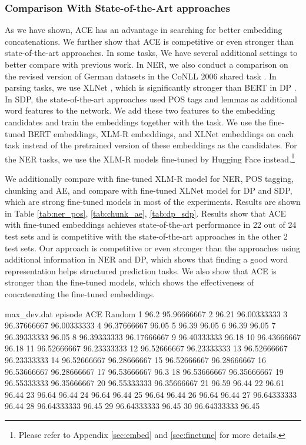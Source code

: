 \documentclass{article} \usepackage{iclr2021_conference,times}
\begin{document}
\subsubsection{Comparison With State-of-the-Art approaches} \label{sec:exp:finetune}
As we have shown, ACE has an advantage in searching for better embedding concatenations. We further show that ACE is competitive or even stronger than state-of-the-art approaches. In some tasks, We have several additional settings to better compare with previous work. In NER, we also conduct a comparison on the revised version of German datasets in the CoNLL 2006 shared task \citep{buchholz-marsi-2006-conll}. In parsing tasks, we use XLNet \citep{yang2019xlnet}, which is significantly stronger than BERT in DP \citep{zhou-zhao-2019-head}. In SDP, the state-of-the-art approaches used POS tags and lemmas as additional word features to the network. We add these two features to the embedding candidates and train the embeddings together with the task. We use the fine-tuned BERT embeddings, XLM-R embeddings, and XLNet embeddings on each task instead of the pretrained version of these embeddings as the candidates. For the NER tasks, we use the XLM-R models fine-tuned by Hugging Face instead.\footnote{Please refer to Appendix \ref{sec:embed} and \ref{sec:finetune} for more details.}

We additionally compare with fine-tuned XLM-R model for NER, POS tagging, chunking and AE, and compare with fine-tuned XLNet model for DP and SDP, which are strong fine-tuned models in most of the experiments. Results are shown in Table \ref{tab:ner_pos}, \ref{tab:chunk_ae}, \ref{tab:dp_sdp}.
Results show that ACE with fine-tuned embeddings achieves state-of-the-art performance in 22 out of 24 test sets and is competitive with the state-of-the-art approaches in the other 2 test sets. 
Our approach is competitive or even stronger than the approaches using additional information in NER and DP, which shows that finding a good word representation helps structured prediction tasks. We also show that ACE is stronger than the fine-tuned models, which shows the effectiveness of concatenating the fine-tuned embeddings.



\begin{filecontents}{max_dev.dat}
episode	ACE	Random
1	96.2	95.96666667
2	96.21	96.00333333
3	96.37666667	96.00333333
4	96.37666667	96.05
5	96.39	96.05
6	96.39	96.05
7	96.39333333	96.05
8	96.39333333	96.17666667
9	96.40333333	96.18
10	96.43666667	96.18
11	96.52666667	96.23333333
12	96.52666667	96.23333333
13	96.52666667	96.23333333
14	96.52666667	96.28666667
15	96.52666667	96.28666667
16	96.53666667	96.28666667
17	96.53666667	96.3
18	96.53666667	96.35666667
19	96.55333333	96.35666667
20	96.55333333	96.35666667
21	96.59	96.44
22	96.61	96.44
23	96.64	96.44
24	96.64	96.44
25	96.64	96.44
26	96.64	96.44
27	96.64333333	96.44
28	96.64333333	96.45
29	96.64333333	96.45
30	96.64333333	96.45
\end{filecontents}
\end{document}
